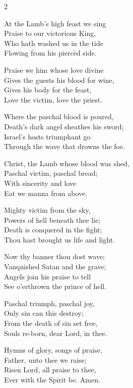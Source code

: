 \begin{multicols}{2}
\raggedcolumns
\begin{enpars}
At the Lamb’s high feast we sing\\
Praise to our victorious King,\\
Who hath washed us in the tide\\
Flowing from his piercèd side.

Praise we him whose love divine\\
Gives the guests his blood for wine,\\
Gives his body for the feast,\\
Love the victim, love the priest.

Where the paschal blood is poured,\\
Death’s dark angel sheathes his sword;\\
Israel’s hosts triumphant go\\
Through the wave that drowns the foe.

Christ, the Lamb whose blood was shed,\\
Paschal victim, paschal bread;\\
With sincerity and love\\
Eat we manna from above.

Mighty victim from the sky,\\
Powers of hell beneath thee lie;\\
Death is conquered in the fight;\\
Thou hast brought us life and light.

Now thy banner thou dost wave;\\
Vanquished Satan and the grave;\\
Angels join his praise to tell\\
See o’erthrown the prince of hell.

Paschal triumph, paschal joy,\\
Only sin can this destroy;\\
From the death of sin set free,\\
Souls re-born, dear Lord, in thee.

Hymns of glory, songs of praise,\\
Father, unto thee we raise;\\
Risen Lord, all praise to thee,\\
Ever with the Spirit be. Amen.

\end{enpars}
\end{multicols}